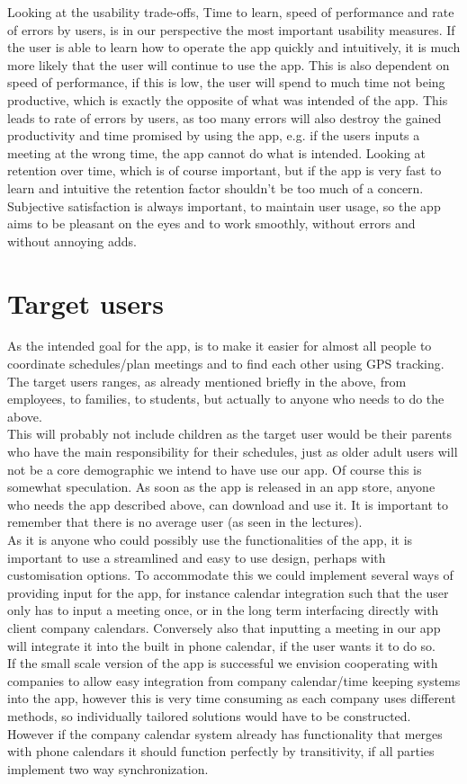 \documentclass{article}
\begin{document}
Looking at the usability trade-offs, Time to learn, speed of performance and rate of errors by users, is in our perspective the most important usability measures. If the user is able to learn how to operate the app quickly and intuitively, it is much more likely that the user will continue to use the app. This is also dependent on speed of performance, if this is low, the user will spend to much time not being productive, which is exactly the opposite of what was intended of the app. This leads to rate of errors by users, as too many errors will also destroy the gained productivity and time promised by using the app, e.g. if the users inputs a meeting at the wrong time, the app cannot do what is intended. Looking at retention over time, which is of course important, but if the app is very fast to learn and intuitive the retention factor shouldn't be too much of a concern. Subjective satisfaction is always important, to maintain user usage, so the app aims to be pleasant on the eyes and to work smoothly, without errors and without annoying adds.


\section{Target users}
As the intended goal for the app, is to make it easier for almost all people to coordinate schedules/plan meetings and to find each other using GPS tracking. The target users ranges, as already mentioned briefly in the above, from employees, to families, to students, but actually to anyone who needs to do the above. \\
This will probably not include children as the target user would be their parents who have the main responsibility for their schedules, just as older adult users will not be a core demographic we intend to have use our app. Of course this is somewhat speculation. As soon as the app is released in an app store, anyone who needs the app described above, can download and use it. It is important to remember that there is no average user (as seen in the lectures). \\


As it is anyone who could possibly use the functionalities of the app, it is important to use a streamlined and easy to use design, perhaps with customisation options. To accommodate this we could implement several ways of providing input for the app, for instance calendar integration such that the user only has to input a meeting once, or in the long term interfacing directly with client company calendars. Conversely also that inputting a meeting in our app will integrate it into the built in phone calendar, if the user wants it to do so.
\\ If the small scale version of the app is successful we envision cooperating with companies to allow easy integration from company calendar/time keeping systems into the app, however this is very time consuming as each company uses different methods, so individually tailored solutions would have to be constructed. However if the company calendar system already has functionality that merges with phone calendars it should function perfectly by transitivity, if all parties implement two way synchronization.
\end{document}

